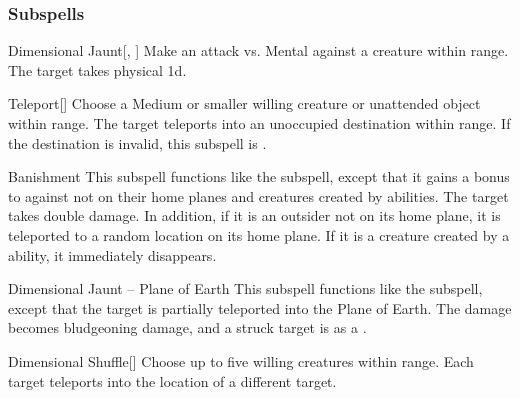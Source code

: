 \subsubsection{Subspells}


\begin{ability}[\nth{1}]{Dimensional Jaunt}[, ]
Make an attack vs. Mental against a creature within \rngmed range.
\hit The target takes physical  \plus1d.
\end{ability}
\vspace{0.25em}


\begin{ability}[\nth{1}]{Teleport}[]
Choose a Medium or smaller willing creature or unattended object within \rngclose range.
The target teleports into an unoccupied destination within range.
If the destination is invalid, this subspell is .
\end{ability}
\vspace{0.25em}


\begin{ability}[\nth{2}]{Banishment}
This subspell functions like the  subspell, except that it gains a  bonus to  against  not on their home planes and creatures created by  abilities.
\crit The target takes double damage.
In addition, if it is an outsider not on its home plane, it is teleported to a random location on its home plane.
If it is a creature created by a  ability, it immediately disappears.
\end{ability}
\vspace{0.25em}


\begin{ability}[\nth{2}]{Dimensional Jaunt -- Plane of Earth}
This subspell functions like the  subspell, except that the target is partially teleported into the Plane of Earth.
The damage becomes bludgeoning damage, and a struck target is  as a .
\end{ability}
\vspace{0.25em}


\begin{ability}[\nth{2}]{Dimensional Shuffle}[]
Choose up to five willing creatures within \rngmed range.
Each target teleports into the location of a different target.
\end{ability}
\vspace{0.25em}


